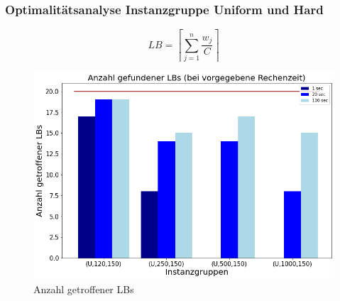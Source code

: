 \documentclass{beamer}
\begin{document}
\begin{frame}

\frametitle{Optimalitätsanalyse Instanzgruppe Uniform und Hard}
\begin{footnotesize}
\begin{equation}
LB = \left\lceil\sum_{j=1}^{n} \frac{w_j}{C}\right\rceil
\end{equation}
\end{footnotesize}


\begin{figure}[!htbp]
\begin{center}
\includegraphics[scale=0.3]{img/lb_unif.png}
\end{center}
\caption{Anzahl getroffener LBs}
\label{fig:LBs}
\end{figure}



\end{frame}
\end{document}
